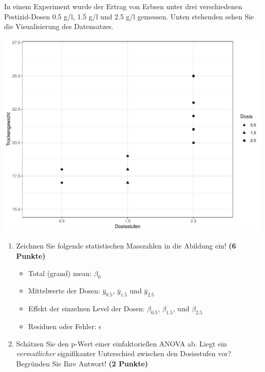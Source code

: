 \documentclass[a4paper, 10pt]{scrartcl}\usepackage[]{graphicx}\usepackage[]{xcolor}
\makeatletter
\def\maxwidth{ %
  \ifdim\Gin@nat@width>\linewidth
    \linewidth
  \else
    \Gin@nat@width
  \fi
}
\newenvironment{knitrout}{}{} %
\makeatother
\begin{document}
In einem Experiment wurde der Ertrag von Erbsen unter drei verschiedenen
Pestizid-Dosen 0.5 g/l, 1.5 g/l und 2.5 g/l gemessen. Unten stehenden sehen
Sie die Visualisierung des Datensatzes.

\begin{knitrout}
\color{fgcolor}

{\centering \includegraphics[width=\maxwidth]{img/anova-01-a-1} 

}


\end{knitrout}

\begin{enumerate}
\item Zeichnen Sie folgende statistischen Masszahlen in die Abildung ein! \textbf{(6 Punkte)}
  \begin{itemize}
  \item Total (grand) mean: $\beta_0$
  \item Mittelwerte der Dosen: $\bar{y}_{0.5}$, $\bar{y}_{1.5}$ und $\bar{y}_{2.5}$
  \item Effekt der einzelnen Level der Dosen: $\beta_{0.5}$, $\beta_{1.5}$,
    und $\beta_{2.5}$
  \item Residuen oder Fehler: $\epsilon$
  \end{itemize}
\item Sch{\"a}tzen Sie den p-Wert einer einfaktoriellen ANOVA ab. Liegt ein
  \textit{vermutlicher} signifikanter Unterschied zwischen den Dosisstufen
  vor? Begr{\"u}nden Sie Ihre Antwort! \textbf{(2 Punkte)}
\end{enumerate}
 
\end{document}
